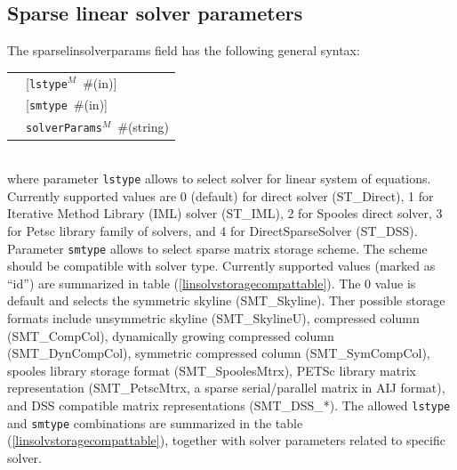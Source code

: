 \documentclass[a4paper]{article}
\makeatletter
\newcommand{\param}[1]{\texttt{#1}} %
\newcommand{\optional}[1]{[#1]} %
\newcommand{\field}[2]{\param{#1}~\#{\tiny(#2)}} %
\newcommand{\optField}[2]{\optional{\field{#1}{#2}}}
\newenvironment{record}[1][]{\begin{tabular}{|ll}}{\end{tabular}\\}
\newcommand{\recentry}[2]{{#1}&{#2}\\}
\newcounter{rcc}
\newenvironment{record}[1][\textwidth]{\setcounter{rcc}{0}\begin{tabular*}{#1}{|ll@{\extracolsep{\fill}}r}}{\end{tabular*}\\}
\newcommand{\recentry}[2]{\ifthenelse{\value{rcc}>0}{&$\backslash$ \\}{\setcounter{rcc}{1}}{#1}&{#2}}
\makeatother
\begin{document}
\subsection{Sparse linear solver parameters}
\label{sparselinsolver}
The sparselinsolverparams field has the following general syntax:\\
\begin{record}
  \recentry{\hspace{20mm}}{\optField{lstype$^M$}{in}}
  \recentry{}{\optField{smtype}{in}}
  \recentry{}{\field{solverParams$^M$}{string}}
\end{record}
where parameter \param{lstype} allows to select solver for linear system of
equations. Currently supported values are 0 (default) for direct solver
(ST\_Direct), 1 for Iterative Method Library (IML) solver (ST\_IML),
2 for Spooles direct solver, 3 for Petsc
library family of solvers, and 4 for DirectSparseSolver (ST\_DSS).
Parameter \param{smtype} allows to select sparse matrix storage
scheme. The scheme should be compatible with solver type.
Currently supported values (marked as ``id'') are summarized in table
(\ref{linsolvstoragecompattable}). The 0 value is default and selects
the symmetric skyline (SMT\_Skyline). Ther possible storage formats
include unsymmetric skyline (SMT\_SkylineU),
compressed column (SMT\_CompCol), dynamically growing compressed
column (SMT\_DynCompCol), symmetric compressed column
(SMT\_SymCompCol), spooles library storage format (SMT\_SpoolesMtrx),
PETSc library matrix representation (SMT\_PetscMtrx, a sparse
serial/parallel matrix in AIJ format), and DSS compatible matrix
representations (SMT\_DSS\_*).
The allowed \param{lstype} and \param{smtype} combinations are
summarized in the table (\ref{linsolvstoragecompattable}), together
with solver parameters related to specific solver.
\end{document}
